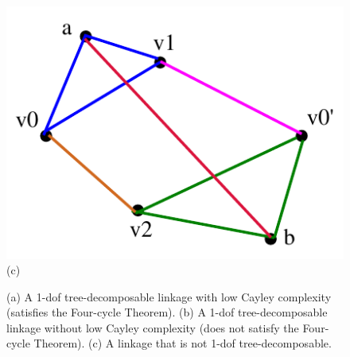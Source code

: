 \documentclass[prodmode,acmtoms]{acmsmall}
\begin{document}
\begin{figure}
\begin{minipage}{.33\linewidth}
  \centering
  \includegraphics[width=.9\linewidth]{img/nott}
  \label{fig:sub3}
   (c)
\end{minipage}%



\caption{ 
(a) A 1-dof tree-decomposable  linkage with low Cayley complexity (satisfies the Four-cycle Theorem). 
(b)  A 1-dof tree-decomposable  linkage without low Cayley complexity (does not satisfy the Four-cycle Theorem).  
(c) A linkage that is not 1-dof tree-decomposable.
}

\label{fig:four_cycle}

\end{figure}
\end{document}

